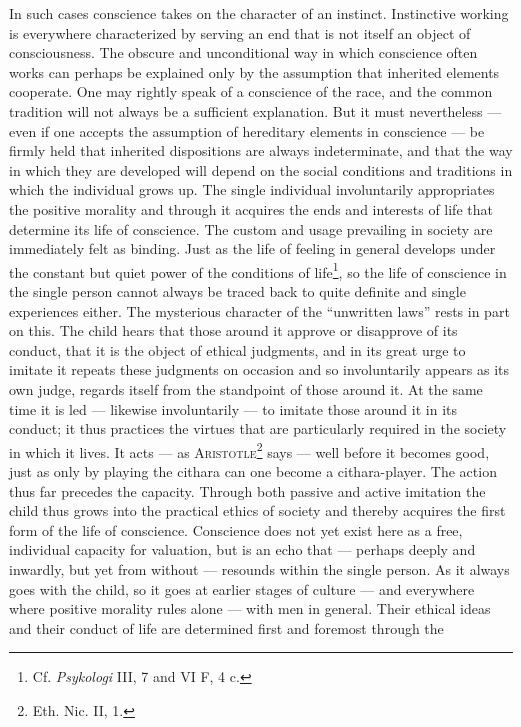 \documentclass[12pt,a4paper,openany]{book}
\newcommand{\opage}[1]{\marginnote{\footnotesize\textit{[#1]}}}
\begin{document}
In such cases conscience takes on the character of an instinct. Instinctive working is everywhere
characterized by serving an end that is not itself an object of consciousness. The obscure and
unconditional way in which conscience often works can perhaps be explained only by the assumption that
inherited elements cooperate. One may rightly speak of a conscience of the race, and the common
tradition will not always be a sufficient explanation. But it must nevertheless --- even if one accepts
the assumption of hereditary elements in conscience --- be firmly held that inherited dispositions are
always indeterminate, and that the way in which they are developed will depend on the social conditions
and traditions in which the individual grows up. The single individual involuntarily appropriates the
positive morality and through it acquires the ends and interests of life that determine its life of
conscience. The custom and usage prevailing in society are immediately felt as binding. Just as the life
of feeling in general develops under the constant but quiet power of the conditions of
life\footnote[2]{Cf. \textit{Psykologi} III, 7 and VI F, 4 c.}, so the life of conscience in the single
person cannot always be traced back to quite definite and single experiences either. The mysterious
character of the ``unwritten laws''
\opage{84}rests in part on this. The child hears that those around it approve or disapprove of its conduct,
that it is the object of ethical judgments, and in its great urge to imitate it repeats these judgments
on occasion and so involuntarily appears as its own judge, regards itself from the standpoint of those
around it. At the same time it is led --- likewise involuntarily --- to imitate those around it in its
conduct; it thus practices the virtues that are particularly required in the society in which it lives.
It acts --- as \textsc{Aristotle}\footnote[1]{Eth. Nic. II, 1.} says --- well before it becomes good,
just as only by playing the cithara can one become a cithara-player. The action thus far precedes the
capacity. Through both passive and active imitation the child thus grows into the practical ethics of
society and thereby acquires the first form of the life of conscience. Conscience does not yet exist
here as a free, individual capacity for valuation, but is an echo that --- perhaps deeply and inwardly,
but yet from without --- resounds within the single person. As it always goes with the child, so it
goes at earlier stages of culture --- and everywhere where positive morality rules alone --- with men
in general. Their ethical ideas and their conduct of life are determined first and foremost through the
\end{document}
